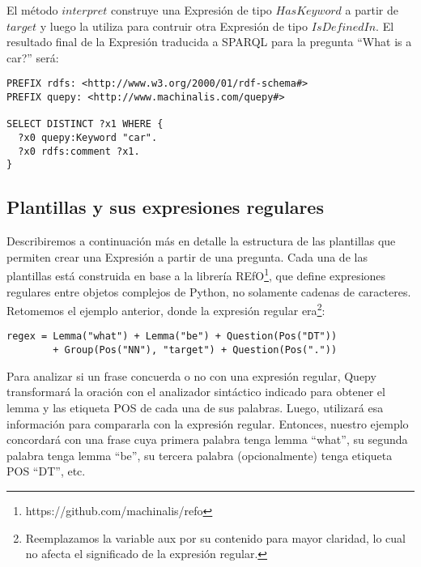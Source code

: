 El método $interpret$ construye una Expresión de tipo $HasKeyword$ a partir de $target$ y luego la utiliza para contruir otra Expresión de tipo $IsDefinedIn$. El resultado final de la Expresión traducida a SPARQL para la pregunta ``What is a car?'' será:

\vspace{5mm}

\begin{lstlisting}
PREFIX rdfs: <http://www.w3.org/2000/01/rdf-schema#>
PREFIX quepy: <http://www.machinalis.com/quepy#>

SELECT DISTINCT ?x1 WHERE {
  ?x0 quepy:Keyword "car".
  ?x0 rdfs:comment ?x1.
}
\end{lstlisting}

\vspace{5mm}

\subsection{Plantillas y sus expresiones regulares}

Describiremos a continuación más en detalle la estructura de las plantillas que permiten crear una Expresión a partir de una pregunta. Cada una de las plantillas está construida en base a la librería REfO\footnote{https://github.com/machinalis/refo}, que define expresiones regulares entre objetos complejos de Python, no solamente cadenas de caracteres. Retomemos el ejemplo anterior, donde la expresión regular era\footnote{Reemplazamos la variable aux por su contenido para mayor claridad, lo cual no afecta el significado de la expresión regular.}:

\vspace{5mm}

\begin{lstlisting}
regex = Lemma("what") + Lemma("be") + Question(Pos("DT"))
        + Group(Pos("NN"), "target") + Question(Pos("."))
\end{lstlisting}

\vspace{5mm}

Para analizar si un frase concuerda o no con una expresión regular, Quepy transformará la oración con el analizador sintáctico indicado para obtener el lemma y las etiqueta POS de cada una de sus palabras. Luego, utilizará esa información para compararla con la expresión regular. Entonces, nuestro ejemplo concordará con una frase cuya primera palabra tenga lemma ``what'', su segunda palabra tenga lemma ``be'', su tercera palabra (opcionalmente) tenga etiqueta POS ``DT'', etc.

